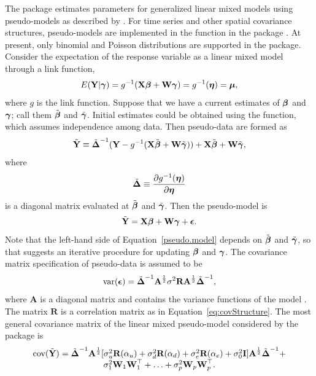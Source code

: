 \documentclass[nojss]{jss}
\def\bbeta{\mbox{\boldmath $\beta$}}
\def\bgamma{\mbox{\boldmath $\gamma$}}
\def\bepsilon{\mbox{\boldmath $\epsilon$}}
\def\bmu{\mbox{\boldmath $\mu$}}
\def\bldeta{\mbox{\boldmath $\eta$}}
\def\bDelta{\mbox{\boldmath $\Delta$}}
\def\bA{\textbf{A}}
\def\bY{\textbf{Y}}
\def\bX{\textbf{X}}
\def\bR{\textbf{R}}
\def\bW{\textbf{W}}
\def\bI{\textbf{I}}
\def\cov{\textrm{cov}}
\begin{document}
The  package estimates parameters for generalized linear
mixed models using pseudo-models as described by
\citet{Wolf:Ocon:gene:1993}. For time series and other spatial
covariance structures, pseudo-models are implemented in the
 function in the  package
\citep{Vene:Ripl:mode:2002}.  At present, only binomial and Poisson
distributions are supported in the  package. Consider the
expectation of the response variable as a linear mixed model through a
link function,
%
%
\begin{equation} \label{glm.mean}
	 E(\bY|\bgamma) =
	   g^{-1}(\bX \bbeta + \bW \bgamma) =
	   g^{-1}(\bldeta) = \bmu,
\end{equation}
%
where $g$ is the link function. Suppose that we have a current
estimates of $\bbeta$ and $\bgamma$; call them $\tilde{\bbeta}$ and
$\tilde{\bgamma}$. Initial estimates could be obtained using the
 function, which assumes independence among data.  Then
pseudo-data are formed as
%
%
\begin{equation} \label{pseudo.data}
	\tilde{\bY} \equiv \tilde{\bDelta}^{-1}(\bY -
	  g^{-1}(\bX \tilde{\bbeta} + \bW \tilde{\bgamma})) +
	  \bX \tilde{\bbeta} + \bW \tilde{\bgamma},
\end{equation}
where
\[
   \tilde{\bDelta} \equiv
     \frac{\partial g^{-1}(\bldeta)}
     {\partial \bldeta}
\]
is a diagonal matrix evaluated at $\tilde{\bbeta}$ and $\tilde{\bgamma}$.
Then the pseudo-model is
%
%
\begin{equation} \label{pseudo.model}
	 \tilde{\bY} = \bX\bbeta + \bW\bgamma + \bepsilon.
\end{equation}
Note that the left-hand side of Equation~\ref{pseudo.model} depends on
$\tilde{\bbeta}$ and $\tilde{\bgamma}$, so that suggests an iterative
procedure for updating $\bbeta$ and $\bgamma$.  The covariance matrix
specification of pseudo-data is assumed to be
\[
   \textrm{var}(\bepsilon) =
     \tilde{\bDelta}^{-1}\bA^{\frac{1}{2}}\sigma^2\bR
       \bA^{\frac{1}{2}}\tilde{\bDelta}^{-1},
\]
where $\bA$ is a diagonal matrix and contains the variance functions
of the model \citep*[e.g.,][Table 2.1]{McCu:Neld:gene:1989}. The
matrix $\bR$ is a correlation matrix as in
Equation~\ref{eq:covStructure}.  The most general covariance matrix of
the linear mixed pseudo-model considered by the  package is
%
%
\begin{equation} \label{eq:pseudo.marg.cov}
	\begin{array}{c}
  \cov(\tilde{\bY}) = \tilde{\bDelta}^{-1}\bA^{\frac{1}{2}}
	[\sigma_u^2\bR(\alpha_u) + \sigma_d^2\bR(\alpha_d) +
	\sigma_e^2\bR(\alpha_e) + \sigma_0^2\bI]
	\bA^{\frac{1}{2}}\tilde{\bDelta}^{-1} + \\
	\sigma_1^2\bW_1\bW_1^\top + \ldots +
	\sigma_p^2\bW_p\bW_p^\top.
	\end{array}
\end{equation}
\end{document}
